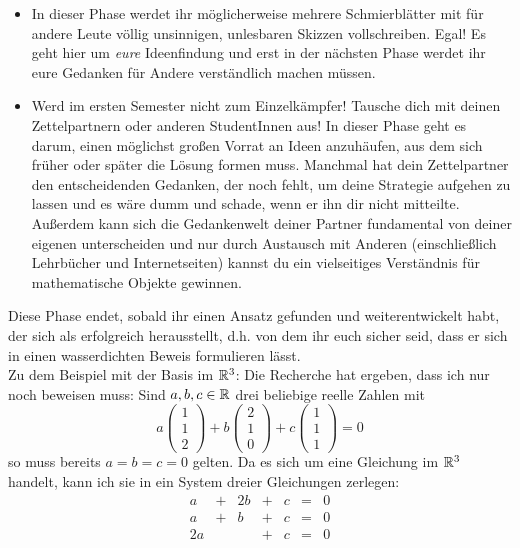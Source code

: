 \begin{phasetwo}[Rumprobieren]
\begin{itemize}
        \item In dieser Phase werdet ihr möglicherweise mehrere Schmierblätter mit für andere Leute völlig unsinnigen, unlesbaren Skizzen vollschreiben. Egal! Es geht hier um \emph{eure} Ideenfindung und erst in der nächsten Phase werdet ihr eure Gedanken für Andere verständlich machen müssen.
        \item Werd im ersten Semester nicht zum Einzelkämpfer! Tausche dich mit deinen Zettelpartnern oder anderen StudentInnen aus! In dieser Phase geht es darum, einen möglichst großen Vorrat an Ideen anzuhäufen, aus dem sich früher oder später die Lösung formen muss. Manchmal hat dein Zettelpartner den entscheidenden Gedanken, der noch fehlt, um deine Strategie aufgehen zu lassen und es wäre dumm und schade, wenn er ihn dir nicht mitteilte. Außerdem kann sich die Gedankenwelt deiner Partner fundamental von deiner eigenen unterscheiden und nur durch Austausch mit Anderen (einschließlich Lehrbücher und Internetseiten) kannst du ein vielseitiges Verständnis für mathematische Objekte gewinnen.
    \end{itemize}
    Diese Phase endet, sobald ihr einen Ansatz gefunden und weiterentwickelt habt, der sich als erfolgreich herausstellt, d.h. von dem ihr euch sicher seid, dass er sich in einen wasserdichten Beweis formulieren lässt. \\[0.5em]
    Zu dem Beispiel mit der Basis im $\mathbb R^3$: Die Recherche hat ergeben, dass ich nur noch beweisen muss: Sind $a,b,c\in \mathbb R$ drei beliebige reelle Zahlen mit
        \[ a\begin{pmatrix} 1 \\ 1 \\ 2 \end{pmatrix} + b \begin{pmatrix} 2 \\ 1 \\ 0 \end{pmatrix}+c \begin{pmatrix} 1 \\ 1 \\ 1 \end{pmatrix} = 0  \]
    so muss bereits $a=b=c=0$ gelten. Da es sich um eine Gleichung im $\mathbb R^3$ handelt, kann ich sie in ein System dreier Gleichungen zerlegen:
    \[\begin{array}{ccccccc}
        a &+& 2b &+& c &=& 0 \\
        a &+& b &+& c & =& 0 \\
        2a && &+ &c & =& 0
    \end{array}\]

\end{phasetwo}

